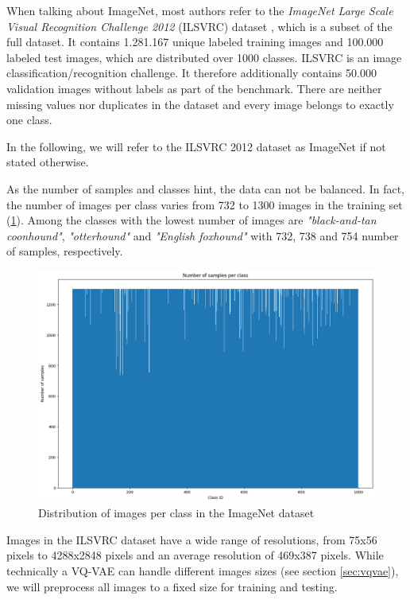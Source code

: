 \documentclass[10pt,a4paper,twoside]{article}
\begin{document}
    When talking about ImageNet, most authors refer to the \textit{ImageNet Large Scale Visual Recognition Challenge 2012} (ILSVRC) dataset \cite{ILSVRC15}, which is a subset of the full dataset. It contains 1.281.167 unique labeled training images and 100.000 labeled test images, which are distributed over 1000 classes. ILSVRC is an image classification/recognition challenge. It therefore additionally contains 50.000 validation images without labels as part of the benchmark. There are neither missing values nor duplicates in the dataset and every image belongs to exactly one class.

    In the following, we will refer to the ILSVRC 2012 dataset as ImageNet if not stated otherwise.

    As the number of samples and classes hint, the data can not be balanced. In fact, the number of images per class varies from 732 to 1300 images in the training set (\ref{fig:imnet_dist}). Among the classes with the lowest number of images are \textit{"black-and-tan coonhound"}, \textit{"otterhound"} and \textit{"English foxhound"} with 732, 738 and 754 number of samples, respectively. 

    \begin{figure}
        \centering
        \includegraphics[width=\textwidth]{../../sample_images/imagenet_dist.png}
        \caption{Distribution of images per class in the ImageNet dataset}
        \label{fig:imnet_dist}
    \end{figure}

    Images in the ILSVRC dataset have a wide range of resolutions, from 75x56 pixels to 4288x2848 pixels and an average resolution of 469x387 pixels. While technically a VQ-VAE can handle different images sizes (see section \ref{sec:vqvae}), we will preprocess all images to a fixed size for training and testing. 
\end{document}
